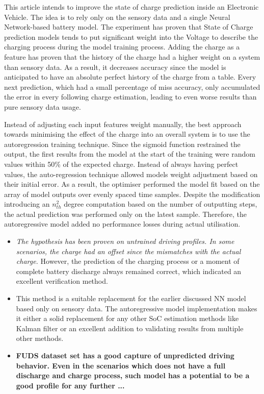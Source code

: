 This article intends to improve the state of charge prediction inside an Electronic Vehicle.
The idea is to rely only on the sensory data and a single Neural Network-based battery model.
The experiment has proven that State of Charge prediction models tends to put significant weight into the Voltage to describe the charging process during the model training process.
Adding the charge as a feature has proven that the history of the charge had a higher weight on a system than sensory data.
As a result, it decreases accuracy since the model is anticipated to have an absolute perfect history of the charge from a table.
Every next prediction, which had a small percentage of miss accuracy, only accumulated the error in every following charge estimation, leading to even worse results than pure sensory data usage.

%
%
Instead of adjusting each input features weight manually, the best approach towards minimising the effect of the charge into an overall system is to use the autoregression training technique. 
Since the sigmoid function restrained the output, the first results from the model at the start of the training were random values within 50\% of the expected charge.
Instead of always having perfect values, the auto-regression technique allowed models weight adjustment based on their initial error.
As a result, the optimiser performed the model fit based on the array of model outputs over evenly spaced time samples.
Despite the modification introducing an $n_{th}^{2}$ degree computation based on the number of outputting steps, the actual prediction was performed only on the latest sample.
Therefore, the autoregressive model added no performance losses during actual utilisation. 
\begin{itemize}
    \item \textit{The hypothesis has been proven on untrained driving profiles. In some scenarios, the charge had an offset since the mismatches with the actual charge.}
    However, the prediction of the charging process or a moment of complete battery discharge always remained correct, which indicated an excellent verification method. \\
    
    \item This method is a suitable replacement for the earlier discussed NN model based only on sensory data.
    The autoregressive model implementation makes it either a solid replacement for any other SoC estimation methods like Kalman filter or an excellent addition to validating results from multiple other methods.

    \item \textbf{FUDS dataset set has a good capture of unpredicted driving behavior. Even in the scenarios which does not have a full discharge and charge process, such model has a potential to be a good profile for any further ...}
\end{itemize}

